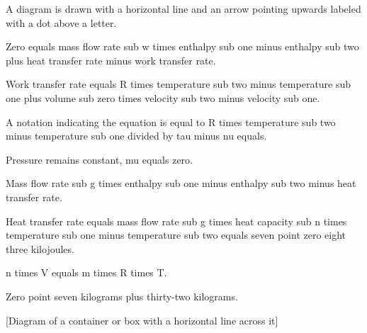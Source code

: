 A diagram is drawn with a horizontal line and an arrow pointing upwards labeled with a dot above a letter.

Zero equals mass flow rate sub w times enthalpy sub one minus enthalpy sub two plus heat transfer rate minus work transfer rate.

Work transfer rate equals R times temperature sub two minus temperature sub one plus volume sub zero times velocity sub two minus velocity sub one.

A notation indicating the equation is equal to R times temperature sub two minus temperature sub one divided by tau minus nu equals.

Pressure remains constant, mu equals zero.

Mass flow rate sub g times enthalpy sub one minus enthalpy sub two minus heat transfer rate.

Heat transfer rate equals mass flow rate sub g times heat capacity sub n times temperature sub one minus temperature sub two equals seven point zero eight three kilojoules.

n times V equals m times R times T.

Zero point seven kilograms plus thirty-two kilograms.

[Diagram of a container or box with a horizontal line across it]